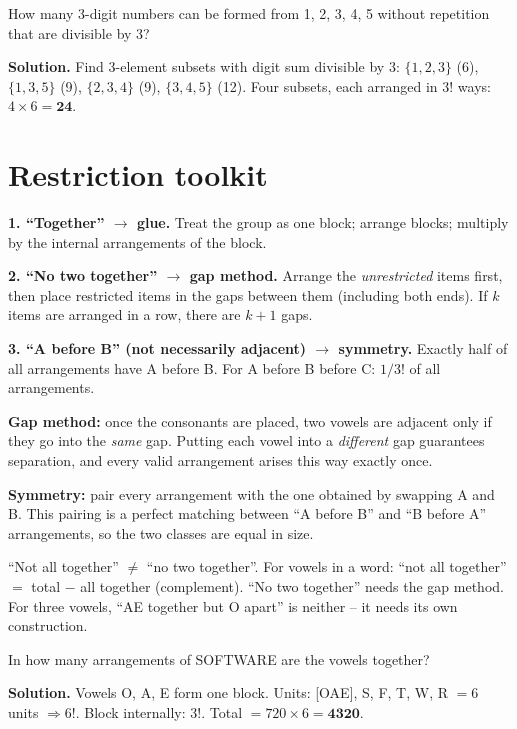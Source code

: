 \documentclass[11pt,a4paper,openany]{report}
\begin{document}
\begin{example}[divisibility by 3]
How many 3-digit numbers can be formed from 1, 2, 3, 4, 5 without repetition that are divisible by 3?

\textbf{Solution.} Find 3-element subsets with digit sum divisible by 3: $\{1,2,3\}$ (6), $\{1,3,5\}$ (9),
$\{2,3,4\}$ (9), $\{3,4,5\}$ (12). Four subsets, each arranged in $3!$ ways: $4\times6=\mathbf{24}$.
\end{example}

\section{Restriction toolkit}
\begin{idea}
\textbf{1. ``Together'' $\to$ glue.} Treat the group as one block; arrange blocks; multiply by
the internal arrangements of the block.

\textbf{2. ``No two together'' $\to$ gap method.} Arrange the \emph{unrestricted} items first,
then place restricted items in the gaps between them (including both ends).
If $k$ items are arranged in a row, there are $k+1$ gaps.

\textbf{3. ``A before B'' (not necessarily adjacent) $\to$ symmetry.} Exactly half of all
arrangements have A before B. For A before B before C: $1/3!$ of all arrangements.
\end{idea}

\begin{why}
\textbf{Gap method:} once the consonants are placed, two vowels are adjacent only if they go into
the \emph{same} gap. Putting each vowel into a \emph{different} gap guarantees separation, and every
valid arrangement arises this way exactly once.

\textbf{Symmetry:} pair every arrangement with the one obtained by swapping A and B. This pairing is a
perfect matching between ``A before B'' and ``B before A'' arrangements, so the two classes are equal in size.
\end{why}

\begin{trap}
``Not all together'' $\neq$ ``no two together''. For vowels in a word:
``not all together'' $=$ total $-$ all together (complement). ``No two together'' needs the gap method.
For three vowels, ``AE together but O apart'' is neither -- it needs its own construction.
\end{trap}

\begin{example}[glue]
In how many arrangements of SOFTWARE are the vowels together?

\textbf{Solution.} Vowels O, A, E form one block. Units: [OAE], S, F, T, W, R $=6$ units $\Rightarrow 6!$.
Block internally: $3!$. Total $=720\times6=\mathbf{4320}$.
\end{example}
\end{document}

